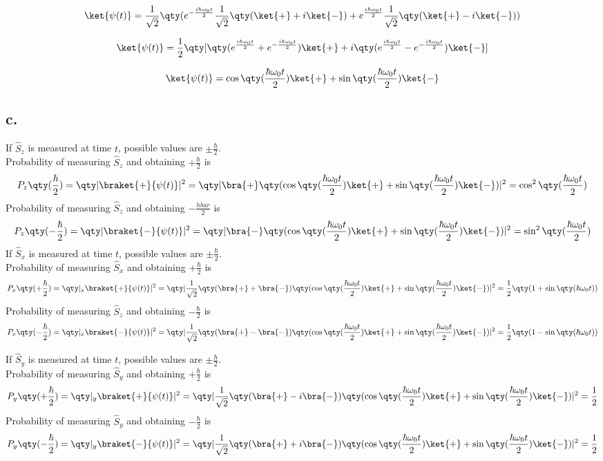 \[\ket{\psi(t)}=\frac{1}{\sqrt{2}}\qty(e^{-\frac{i\hbar\omega_0 t}{2}}\frac{1}{\sqrt{2}}\qty(\ket{+}+i\ket{-})+e^{\frac{i\hbar\omega_0 t}{2}}\frac{1}{\sqrt{2}}\qty(\ket{+}-i\ket{-}))\]

\[\ket{\psi(t)}=\frac{1}{2}\qty[\qty(e^{\frac{i\hbar\omega_0 t}{2}}+e^{-\frac{i\hbar\omega_0 t}{2}})\ket{+}+i\qty(e^{\frac{i\hbar\omega_0 t}{2}}-e^{-\frac{i\hbar\omega_0 t}{2}})\ket{-}]\]

\[\ket{\psi(t)}=\cos\qty({\frac{\hbar\omega_0 t}{2}})\ket{+}+\sin\qty({\frac{\hbar\omega_0 t}{2}})\ket{-}\]

\subsection*{c.}

If $\hat{S}_z$ is measured at time $t$, possible values are $\pm\frac{\hbar}{2}$. \\Probability of measuring $\hat{S}_z$ and obtaining $+\frac{\hbar}{2}$ is 
\[P_z\qty(\frac{\hbar}{2})=\qty|\braket{+}{\psi(t)}|^2=\qty|\bra{+}\qty(\cos\qty({\frac{\hbar\omega_0 t}{2}})\ket{+}+\sin\qty({\frac{\hbar\omega_0 t}{2}})\ket{-})|^2=\cos^2\qty({\frac{\hbar\omega_0 t}{2}})\]
Probability of measuring $\hat{S}_z$ and obtaining $-\frac{hbar}{2}$ is 
\[P_z\qty(-\frac{\hbar}{2})=\qty|\braket{-}{\psi(t)}|^2=\qty|\bra{-}\qty(\cos\qty({\frac{\hbar\omega_0 t}{2}})\ket{+}+\sin\qty({\frac{\hbar\omega_0 t}{2}})\ket{-})|^2=\sin^2\qty({\frac{\hbar\omega_0 t}{2}})\]
If $\hat{S}_x$ is measured at time $t$, possible values are $\pm\frac{\hbar}{2}$. \\Probability of measuring $\hat{S}_x$ and obtaining $+\frac{\hbar}{2}$ is 
\[P_x\qty(+\frac{\hbar}{2})=\qty|_x\braket{+}{\psi(t)}|^2=\qty|\frac{1}{\sqrt{2}}\qty(\bra{+}+\bra{-})\qty(\cos\qty({\frac{\hbar\omega_0 t}{2}})\ket{+}+\sin\qty({\frac{\hbar\omega_0 t}{2}})\ket{-})|^2=\frac{1}{2}\qty(1+\sin\qty({\hbar\omega_0 t}))\]
Probability of measuring $\hat{S}_z$ and obtaining $-\frac{\hbar}{2}$ is 
\[P_x\qty(-\frac{\hbar}{2})=\qty|_x\braket{-}{\psi(t)}|^2=\qty|\frac{1}{\sqrt{2}}\qty(\bra{+}-\bra{-})\qty(\cos\qty({\frac{\hbar\omega_0 t}{2}})\ket{+}+\sin\qty({\frac{\hbar\omega_0 t}{2}})\ket{-})|^2=\frac{1}{2}\qty(1-\sin\qty({\hbar\omega_0 t}))\]

If $\hat{S}_y$ is measured at time $t$, possible values are $\pm\frac{\hbar}{2}$. \\Probability of measuring $\hat{S}_y$ and obtaining $+\frac{\hbar}{2}$ is 
\[P_y\qty(+\frac{\hbar}{2})=\qty|_y\braket{+}{\psi(t)}|^2=\qty|\frac{1}{\sqrt{2}}\qty(\bra{+}-i\bra{-})\qty(\cos\qty({\frac{\hbar\omega_0 t}{2}})\ket{+}+\sin\qty({\frac{\hbar\omega_0 t}{2}})\ket{-})|^2=\frac{1}{2}\]
Probability of measuring $\hat{S}_y$ and obtaining $-\frac{\hbar}{2}$ is 
\[P_y\qty(-\frac{\hbar}{2})=\qty|_y\braket{-}{\psi(t)}|^2=\qty|\frac{1}{\sqrt{2}}\qty(\bra{+}+i\bra{-})\qty(\cos\qty({\frac{\hbar\omega_0 t}{2}})\ket{+}+\sin\qty({\frac{\hbar\omega_0 t}{2}})\ket{-})|^2=\frac{1}{2}\]


